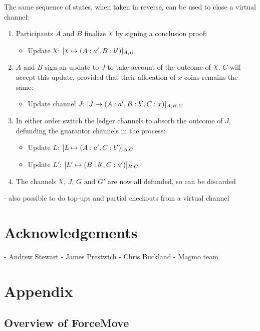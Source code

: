 \documentclass{article}
\begin{document}
The same sequence of states, when taken in reverse, can be used to close a virtual channel:
\begin{enumerate}
  \item Participants $A$ and $B$ finalize $\rchi$ by signing a conclusion proof:
  \begin{itemize}
    \item Update $\rchi$: $\finalizable{\rchi}{\alloc{A:a', B:b'}}{A,B}$
  \end{itemize}
  \item $A$ and $B$ sign an update to $J$ to take account of the outcome of $\rchi$. $C$ will accept this update, provided that their allocation of $x$ coins remains the same:
  \begin{itemize}
    \item Update channel $J$: $[J \mapsto ( A: a', B:b', C: x )]_{A, B, C}$
  \end{itemize}
  \item In either order switch the ledger channels to absorb the outcome of $J$, defunding the guarantor channels in the process:
  \begin{itemize}
    \item Update $L$: $[L \mapsto ( A: a', C: b' )]_{A,C}$
    \item Update $L'$: $[L' \mapsto ( B: b', C: a' )]_{B,C}$
  \end{itemize}
  \item The channels $\rchi$, $J$, $G$ and $G'$ are now all defunded, so can be discarded
\end{enumerate}

- also possible to do top-ups and partial checkouts from a virtual channel








\section{Acknowledgements}

- Andrew Stewart
- James Prestwich
- Chris Buckland
- Magmo team


\section{Appendix}

\subsection{Overview of ForceMove}
\end{document}

